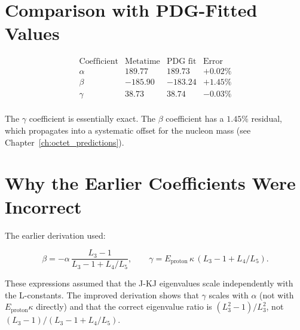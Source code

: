 \section{Comparison with PDG-Fitted Values}

\[
\begin{array}{lccc}
\text{Coefficient} & \text{Metatime} & \text{PDG fit} & \text{Error} \\
\hline
\alpha & 189.77 & 189.73 & +0.02\% \\
\beta   & -185.90 & -183.24 & +1.45\% \\
\gamma  & 38.73 & 38.74 & -0.03\% \\
\end{array}
\]

The \(\gamma\) coefficient is essentially exact.  The \(\beta\) coefficient
has a \(1.45\%\) residual, which propagates into a systematic offset for
the nucleon mass (see Chapter~\ref{ch:octet_predictions}).

\section{Why the Earlier Coefficients Were Incorrect}

The earlier derivation used:

\[
\beta = -\alpha\,\frac{L_3 - 1}{L_3 - 1 + L_4/L_5},
\qquad
\gamma = E_{\text{proton}}\,\kappa\,(L_3 - 1 + L_4/L_5).
\]

These expressions assumed that the J-KJ eigenvalues scale independently
with the L-constants.  The improved derivation shows that \(\gamma\)
scales with \(\alpha\) (not with \(E_{\text{proton}}\kappa\) directly)
and that the correct eigenvalue ratio is \((L_3^2 - 1)/L_3^2\), not
\((L_3-1)/(L_3-1+L_4/L_5)\).

